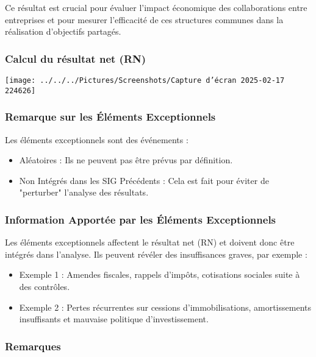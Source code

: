 \documentclass[a4paper, 12pt]{report}
\begin{document}
Ce résultat est crucial pour évaluer l'impact économique des collaborations entre entreprises et pour mesurer l'efficacité de ces structures communes dans la réalisation d'objectifs partagés.

\subsubsection{Calcul du résultat net (RN)}

\begin{center}
\texttt{[image: ../../../Pictures/Screenshots/Capture d'écran 2025-02-17 224626]}
\end{center}

\subsubsection{Remarque sur les Éléments Exceptionnels}

Les éléments exceptionnels sont des événements :

\begin{itemize}
	\item Aléatoires : Ils ne peuvent pas être prévus par définition.
	\item Non Intégrés dans les SIG Précédents : Cela est fait pour éviter de "perturber" l'analyse des résultats.
\end{itemize}

\subsubsection{Information Apportée par les Éléments Exceptionnels}

Les éléments exceptionnels affectent le résultat net (RN) et doivent donc être intégrés dans l'analyse. Ils peuvent révéler des insuffisances graves, par exemple :

\begin{itemize}
	\item Exemple 1 : Amendes fiscales, rappels d'impôts, cotisations sociales suite à des contrôles.
	\item Exemple 2 : Pertes récurrentes sur cessions d'immobilisations, amortissements insuffisants et mauvaise politique d'investissement.
\end{itemize}

\subsubsection{Remarques}
\end{document}
